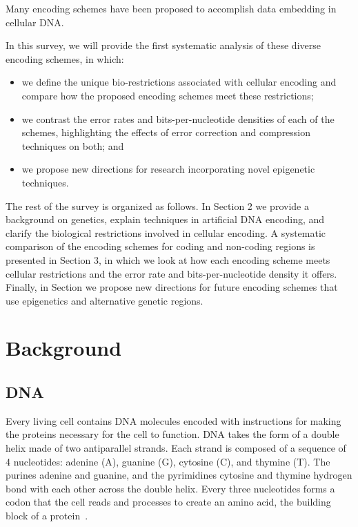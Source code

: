 \documentclass[USenglish,oneside,twocolumn]{article}
\begin{document}
Many encoding schemes have been proposed to accomplish data embedding in cellular DNA.

In this survey, we will provide the first systematic analysis of these diverse encoding schemes, in which:
\\
\begin{itemize}
\item we define the unique bio-restrictions associated with cellular encoding and compare how the proposed encoding schemes meet these restrictions;
\item we contrast the error rates and bits-per-nucleotide densities of each of the schemes, highlighting the effects of error correction and compression techniques on both; and
\item we propose new directions for research incorporating novel epigenetic techniques.
\end{itemize}

The rest of the survey is organized as follows. In Section 2 we provide a background on genetics, explain techniques in artificial DNA encoding, and clarify the biological restrictions involved in cellular encoding. A systematic comparison of the encoding schemes for coding and non-coding regions is presented in Section 3, in which we look at how each encoding scheme meets cellular restrictions and the error rate and bits-per-nucleotide density it offers. Finally, in Section we propose new directions for future encoding schemes that use epigenetics and alternative genetic regions.


\section{Background}

\subsection{DNA}

Every living cell contains DNA molecules encoded with instructions for making the proteins necessary for the cell to function. DNA takes the form of a double helix made of two antiparallel strands. Each strand is composed of a sequence of 4 nucleotides: adenine (A), guanine (G), cytosine (C), and thymine (T). The purines adenine and guanine, and the pyrimidines cytosine and thymine hydrogen bond with each other across the double helix. Every three nucleotides forms a codon that the cell reads and processes to create an amino acid, the building block of a protein~\cite{WC1953N}.
\end{document}
